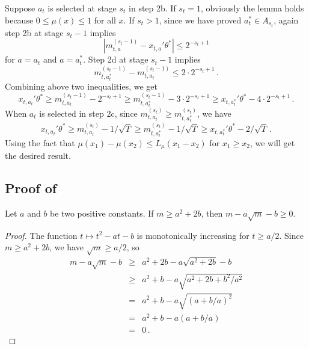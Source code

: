 Suppose $a_t$ is selected at stage $s_t$ in step 2b. If $s_t=1$, obviously the lemma holds because $0 \le \mu(x) \le 1$ for all $x$. If $s_t>1$, since we have proved $a_t^* \in A_{s_t}$, again step 2b at stage $s_t-1$ implies 
$$|m_{t,a}^{(s_t-1)} - x_{t,a}'\theta^*| \le 2^{-s_t+1}$$
for $a=a_t$ and $a=a_t^*$. Step 2d at stage $s_t-1$ implies
$$ m_{t,a_t^*}^{(s_t-1)} -  m_{t,a_t}^{(s_t-1)} \le 2\cdot 2^{-s_t+1}\,.$$
Combining above two inequalities, we get 
$$ x_{t,a_t}'\theta^* \ge m_{t,a_t}^{(s_t-1)} - 2^{-s_t+1} 
\ge m_{t,a_t^*}^{(s_t-1)} - 3\cdot 2^{-s_t+1} \ge x_{t,a_t^*}'\theta^*- 4\cdot 2^{-s_t+1}\,.$$
When $a_t$ is selected in step 2c, since $m_{t,a_t}^{(s_t)} \ge m_{t,a_t^*}^{(s_t)}$, we have
$$ x_{t,a_t}'\theta^* \ge m_{t,a_t}^{(s_t)} - 1/\sqrt{T} 
\ge m_{t,a_t^*}^{(s_t)} - 1/\sqrt{T} \ge x_{t,a_t^*}'\theta^*- 2/\sqrt{T}\,.$$
Using the fact that $\mu(x_1)-\mu(x_2) \le L_\mu (x_1-x_2)$ for $x_1 \ge  x_2$, we will get the desired result.

\subsection{Proof of }

\begin{lemma}
\label{lem:quad-ineq}
Let $a$ and $b$ be two positive constants.  If $m \ge a^2 + 2b$, then $m - a\sqrt{m} - b \ge 0$.
\end{lemma}

\begin{proof}
The function $t \mapsto t^2-at-b$ is monotonically increasing for $t \ge a/2$.  Since $m \ge a^2 + 2b$, we have $\sqrt{m} \ge a/2$, so
\begin{eqnarray*}
m - a\sqrt{m} - b &\ge& a^2 + 2b - a \sqrt{a^2 + 2b} - b \\
&\ge& a^2 + b - a \sqrt{a^2 + 2b + b^2/a^2} \\
&=& a^2 + b - a \sqrt{(a + b/a)^2} \\
&=& a^2 + b - a (a + b/a) \\
&=& 0\,.
\end{eqnarray*}
\end{proof}
